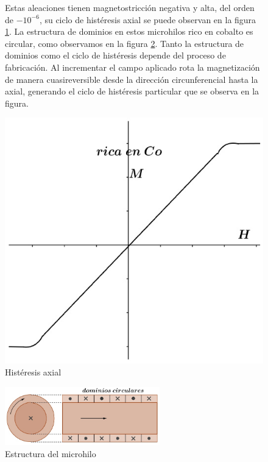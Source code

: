 \begin{figure}[H]
  \begin{minipage}[b]{0.47\textwidth}
Estas aleaciones tienen magnetostricción negativa y alta, del orden de $-10^{-6}$, su ciclo de histéresis axial se puede observan en la figura \ref{fig:315}. La estructura de dominios en estos microhilos rico en cobalto es circular, como observamos en la figura \ref{fig:316}. Tanto la estructura de dominios como el ciclo de histéresis depende del proceso de fabricación. Al incrementar el campo aplicado rota la magnetización de manera cuasireversible desde la dirección circunferencial hasta la axial, generando el ciclo de histéresis particular que se observa en la figura.
  \vspace{0.2cm}
  \end{minipage}
  \hfill
  \begin{minipage}[b]{0.47\textwidth}
     \includegraphics[width=1.0\textwidth]{./Figures/fig315}
     \caption{Histéresis axial}
	\label{fig:315}
  \end{minipage}
\end{figure}

\begin{figure}[H]
    \centering
    \includegraphics[width=0.6\textwidth]{./Figures/fig316}
	\caption{Estructura del microhilo}
	\label{fig:316}
\end{figure}


